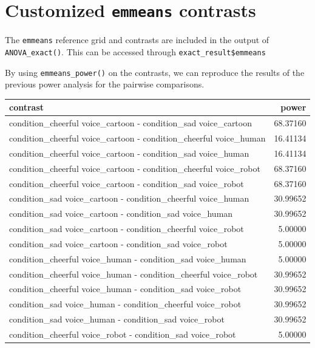 \documentclass[
]{book}
\newenvironment{Shaded}{\begin{snugshade}}{\end{snugshade}}
\newcommand{\DecValTok}[1]{\textcolor[rgb]{0.00,0.00,0.81}{#1}}
\newcommand{\FunctionTok}[1]{\textcolor[rgb]{0.00,0.00,0.00}{#1}}
\newcommand{\NormalTok}[1]{#1}
\newcommand{\SpecialCharTok}[1]{\textcolor[rgb]{0.00,0.00,0.00}{#1}}
\begin{document}
\hypertarget{customized-emmeans-contrasts}{%
\section{\texorpdfstring{Customized \texttt{emmeans} contrasts}{Customized emmeans contrasts}}\label{customized-emmeans-contrasts}}

The \texttt{emmeans} reference grid and contrasts are included in the output of \texttt{ANOVA\_exact()}. This can be accessed through \texttt{exact\_result\$emmeans}

By using \texttt{emmeans\_power()} on the contrasts, we can reproduce the results of the previous power analysis for the pairwise comparisons.

\begin{Shaded}
\end{Shaded}

\begin{tabular}{l|r}
\hline
contrast & power\\
\hline
condition\_cheerful voice\_cartoon - condition\_sad voice\_cartoon & 68.37160\\
\hline
condition\_cheerful voice\_cartoon - condition\_cheerful voice\_human & 16.41134\\
\hline
condition\_cheerful voice\_cartoon - condition\_sad voice\_human & 16.41134\\
\hline
condition\_cheerful voice\_cartoon - condition\_cheerful voice\_robot & 68.37160\\
\hline
condition\_cheerful voice\_cartoon - condition\_sad voice\_robot & 68.37160\\
\hline
condition\_sad voice\_cartoon - condition\_cheerful voice\_human & 30.99652\\
\hline
condition\_sad voice\_cartoon - condition\_sad voice\_human & 30.99652\\
\hline
condition\_sad voice\_cartoon - condition\_cheerful voice\_robot & 5.00000\\
\hline
condition\_sad voice\_cartoon - condition\_sad voice\_robot & 5.00000\\
\hline
condition\_cheerful voice\_human - condition\_sad voice\_human & 5.00000\\
\hline
condition\_cheerful voice\_human - condition\_cheerful voice\_robot & 30.99652\\
\hline
condition\_cheerful voice\_human - condition\_sad voice\_robot & 30.99652\\
\hline
condition\_sad voice\_human - condition\_cheerful voice\_robot & 30.99652\\
\hline
condition\_sad voice\_human - condition\_sad voice\_robot & 30.99652\\
\hline
condition\_cheerful voice\_robot - condition\_sad voice\_robot & 5.00000\\
\hline
\end{tabular}
\end{document}
